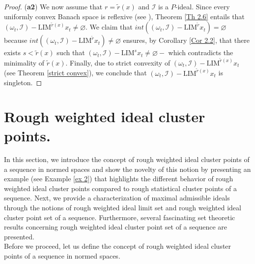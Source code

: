 \documentclass[reqno]{amsart}
\begin{document}
{\begin{proof}
	
	(\textbf{a2}) We now assume that  $r=\tilde{r}(x)$ and $\mathcal{I}$ is a $P$-ideal. 
	Since every uniformly convex Banach space is reflexive (see \cite[Theorem 5.2.15]{megginson2012introduction}),
	 Theorem \ref{Th 2.6} entails that
	$(\omega_t,\mathcal{I})-\text{LIM}^{\tilde r(x)} x_t\neq \varnothing$.
	We claim that  $int((\omega_t,\mathcal{I})-\text{LIM}^{\tilde r} x_t)=\varnothing$ because 
	$int((\omega_t,\mathcal{I})-\text{LIM}^{\tilde r} x_t)\neq\varnothing$ ensures, by Corollary \ref{Cor 2.2}, that there exists  $s<\tilde{r}(x)$ such that $(\omega_t,\mathcal{I})-\text{LIM}^{s} x_t\neq\varnothing-$ which contradicts the minimality of $\tilde r(x)$.
	Finally, due to strict convexity of $(\omega_t,\mathcal{I})-\text{LIM}^{\tilde r(x)} x_t$ (see Theorem \ref{strict convex}), we conclude that $(\omega_t,\mathcal{I})-\text{LIM}^{\tilde r(x)} x_t$ is singleton. \end{proof}


\section{Rough weighted ideal cluster points.}\label{sec 4}
In this section, we introduce the concept of rough weighted ideal cluster points of a sequence in normed spaces and 
show the novelty of this notion by presenting an example (see Example \ref{ex 2}) that highlights the different behavior of rough weighted ideal cluster points compared to rough statistical cluster points of a sequence. 
Next, we provide a characterization of maximal admissible ideals through the notions of rough weighted ideal limit set and rough weighted ideal cluster point set of a sequence. Furthermore, several fascinating set theoretic results concerning rough weighted ideal cluster point set of a sequence are presented.
 \\



Before we proceed, let us define the concept of rough weighted ideal cluster points of a sequence in normed spaces. 

}
\end{document}

